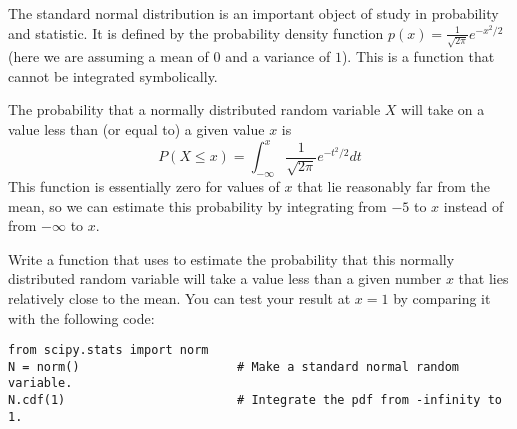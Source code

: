 \begin{comment}
Another common hallmark of quadrature is that it can be used adaptively.
It is common in practice to refine the points of a quadrature estimate on an interval where a function is observed to be changing rapidly.
This allows for more accurate computation at a relatively low computational cost.
This is the approach used by the function \li{scipy.integrate.quad()}.
\end{comment}

\begin{problem} %
The standard normal distribution is an important object of study in probability and statistic.
It is defined by the probability density function $p(x) = \frac{1}{\sqrt{2 \pi}} e^{-x^2/2}$ (here we are assuming a mean of $0$ and a variance of $1$).
This is a function that cannot be integrated symbolically.

The probability that a normally distributed random variable $X$ will take on a value less than (or equal to) a given value $x$ is
\[P(X \le x) = \int_{-\infty}^x \frac{1}{\sqrt{2 \pi}} e^{-t^2/2} dt\]
This function is essentially zero for values of $x$ that lie reasonably far from the mean, so we can estimate this probability by integrating from $-5$ to $x$ instead of from $-\infty$ to $x$.

Write a function that uses  to estimate the probability that this normally distributed random variable will take a value less than a given number $x$ that lies relatively close to the mean.
You can test your result at $x = 1$ by comparing it with the following code:

\begin{lstlisting}
from scipy.stats import norm
N = norm()                      # Make a standard normal random variable.
N.cdf(1)                        # Integrate the pdf from -infinity to 1.
\end{lstlisting}
\end{problem}

\begin{comment}


\section*{Additional Material} %

\end{comment}
